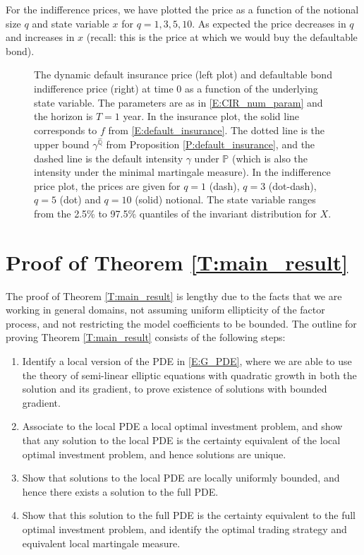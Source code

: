 \documentclass[11pt, letterpaper]{amsart}
\theoremstyle{definition}
\theoremstyle{remark}
\numberwithin{equation}{section}
\newcommand{\prob}{\mathbb{P}}
\newcommand{\qprob}{\mathbb{Q}}
\begin{document}
For the indifference prices, we have plotted the price as a function of the notional size $q$ and state variable $x$ for $q=1,3,5,10$. As expected the price decreases in $q$ and increases in $x$ (recall: this is the price at which we would buy the defaultable bond).


\begin{figure}
\qquad {}
\caption{The dynamic default insurance price (left plot) and defaultable bond indifference price (right)  at time $0$ as a function of the underlying state variable. The parameters are as in \eqref{E:CIR_num_param} and the horizon is $T=1$ year. In the insurance plot, the solid line corresponds to $f$ from \eqref{E:default_insurance}. The dotted line is the upper bound $\gamma^{\hat{\qprob}}$ from Proposition \ref{P:default_insurance}, and the dashed line is the default intensity $\gamma$ under $\prob$ (which is also the intensity under the minimal martingale measure). In the indifference price plot, the prices are given for $q=1$ (dash), $q=3$ (dot-dash), $q=5$ (dot) and $q=10$ (solid) notional. The state variable ranges from the 2.5\% to 97.5\% quantiles of the invariant distribution for $X$.} \label{F:def_ins_indiff_px}
\end{figure}


\section{Proof of Theorem \ref{T:main_result}}\label{S:proof}

The proof of Theorem \ref{T:main_result} is lengthy due to the facts that we are working in general domains, not assuming uniform ellipticity of the factor process, and not restricting the model coefficients to be bounded.   The outline for proving Theorem \ref{T:main_result} consists of the following steps:

\begin{enumerate}[(1)]
\item Identify a local version of the PDE in \eqref{E:G_PDE}, where we are able to use the theory of semi-linear elliptic equations with quadratic growth in both the solution and its gradient, to prove existence of solutions with bounded gradient.
\item Associate to the local PDE a local optimal investment problem, and show that any solution to the local PDE is the certainty equivalent of the local optimal investment problem, and hence solutions are unique.
\item Show that solutions to the local PDE are locally uniformly bounded, and hence there exists a solution to the full PDE.
\item Show that this solution to the full PDE is the certainty equivalent to the full optimal investment problem, and identify the optimal trading strategy and equivalent local martingale measure.
\end{enumerate}
\end{document}
